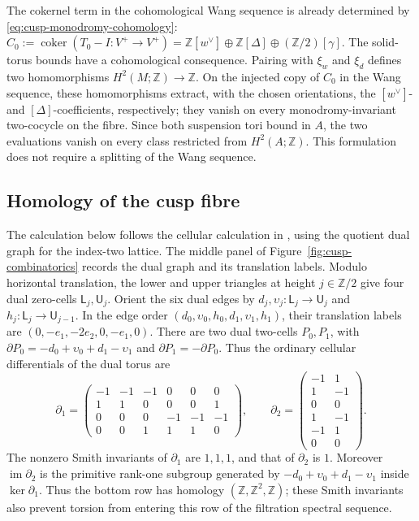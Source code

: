 The cokernel term in the cohomological Wang sequence is already determined by
\eqref{eq:cusp-monodromy-cohomology}:
$C_0:=\operatorname{coker}(T_0-I:V^+\to V^+)
=\mathbb Z[w^\vee]\oplus\mathbb Z[\Delta]
\oplus(\mathbb Z/2)[\gamma]$.
The solid-torus bounds have a cohomological consequence.  Pairing with
$\xi_w$ and $\xi_d$ defines two homomorphisms
$H^2(M;\mathbb Z)\to\mathbb Z$.  On the injected copy of $C_0$ in the
Wang sequence, these homomorphisms extract, with the chosen orientations,
the $[w^\vee]$- and $[\Delta]$-coefficients, respectively; they vanish on
every monodromy-invariant two-cocycle on the fibre.  Since both suspension
tori bound in $A$, the two evaluations vanish on every class restricted from
$H^2(A;\mathbb Z)$.  This formulation does not require a splitting of the
Wang sequence.

\subsection{Homology of the cusp fibre}

The calculation below follows the cellular calculation in
\citep[Appendix~A]{Alpoge2026}, using the quotient dual graph for the
index-two lattice.  The middle panel of
Figure~\ref{fig:cusp-combinatorics} records the dual graph and its translation
labels.
Modulo horizontal translation, the lower and upper triangles at height
$j\in\mathbb Z/2$ give four dual zero-cells
$\mathsf L_j,\mathsf U_j$.  Orient the six dual edges by
$d_j,\upsilon_j:\mathsf L_j\to\mathsf U_j$ and
$h_j:\mathsf L_j\to\mathsf U_{j-1}$.
In the edge order $(d_0,\upsilon_0,h_0,d_1,\upsilon_1,h_1)$, their
translation labels are
$(0,-e_1,-2e_2,0,-e_1,0)$.  There are two dual two-cells
$P_0,P_1$, with $\partial P_0=-d_0+\upsilon_0+d_1-\upsilon_1$ and
$\partial P_1=-\partial P_0$.
Thus the ordinary cellular differentials of the dual torus are
\begin{equation}\label{eq:dual-torus-differentials}
 \partial_1=
 \begin{pmatrix}
 -1&-1&-1& 0& 0& 0\\
  1& 1& 0& 0& 0& 1\\
  0& 0& 0&-1&-1&-1\\
  0& 0& 1& 1& 1& 0
 \end{pmatrix},
 \qquad
 \partial_2=
 \begin{pmatrix}
 -1& 1\\ 1&-1\\ 0&0\\ 1&-1\\-1&1\\0&0
 \end{pmatrix}.
\end{equation}
The nonzero Smith invariants of $\partial_1$ are $1,1,1$, and that of
$\partial_2$ is $1$.  Moreover $\operatorname{im}\partial_2$ is the
primitive rank-one subgroup generated by
$-d_0+\upsilon_0+d_1-\upsilon_1$ inside $\ker\partial_1$.  Thus the
bottom row has homology $(\mathbb Z,\mathbb Z^2,\mathbb Z)$; these Smith
invariants also prevent torsion from entering this row of the filtration
spectral sequence.

